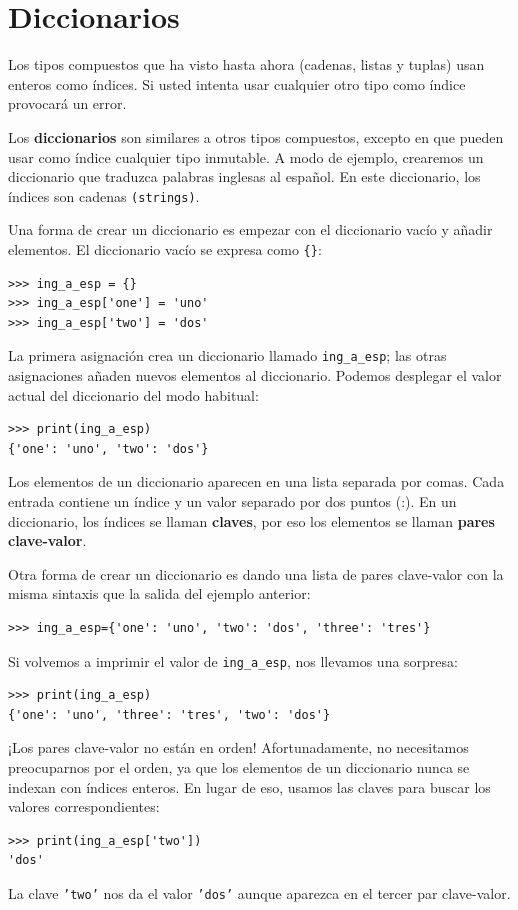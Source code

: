 
\chapter{Diccionarios}

  
  

Los tipos compuestos que ha visto hasta ahora (cadenas, listas y tuplas)
usan enteros como índices. Si usted intenta usar cualquier otro tipo
como índice provocará un error.

Los \textbf{diccionarios} son similares a otros tipos compuestos,
excepto en que pueden usar como índice cualquier tipo inmutable. A
modo de ejemplo, crearemos un diccionario que traduzca palabras inglesas
al español. En este diccionario, los índices son cadenas \texttt{(strings)}.

Una forma de crear un diccionario es empezar con el diccionario vacío
y añadir elementos. El diccionario vacío se expresa como \texttt{\{\}}:
\begin{lstlisting}
>>> ing_a_esp = {}
>>> ing_a_esp['one'] = 'uno'
>>> ing_a_esp['two'] = 'dos'
\end{lstlisting}
La primera asignación crea un diccionario llamado \texttt{ing\_a\_esp};
las otras asignaciones añaden nuevos elementos al diccionario. Podemos
desplegar el valor actual del diccionario del modo habitual:
\begin{lstlisting}
>>> print(ing_a_esp)
{'one': 'uno', 'two': 'dos'}
\end{lstlisting}
Los elementos de un diccionario aparecen en una lista separada por
comas. Cada entrada contiene un índice y un valor separado por dos
puntos (:). En un diccionario, los índices se llaman \textbf{claves},
por eso los elementos se llaman \textbf{pares clave-valor}.

Otra forma de crear un diccionario es dando una lista de pares clave-valor
con la misma sintaxis que la salida del ejemplo anterior:
\begin{lstlisting}
>>> ing_a_esp={'one': 'uno', 'two': 'dos', 'three': 'tres'}
\end{lstlisting}
Si volvemos a imprimir el valor de \texttt{ing\_a\_esp}, nos llevamos
una sorpresa:
\begin{lstlisting}
>>> print(ing_a_esp)
{'one': 'uno', 'three': 'tres', 'two': 'dos'}
\end{lstlisting}
¡Los pares clave-valor no están en orden! Afortunadamente, no necesitamos
preocuparnos por el orden, ya que los elementos de un diccionario
nunca se indexan con índices enteros. En lugar de eso, usamos las
claves para buscar los valores correspondientes:
\begin{lstlisting}
>>> print(ing_a_esp['two'])
'dos'
\end{lstlisting}
La clave \texttt{'two'} nos da el valor \texttt{'dos'} aunque aparezca
en el tercer par clave-valor.

